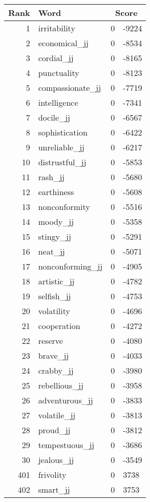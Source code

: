 \begin{longtable}[!htbp]{| rlr@{.}l |}
    \hline
    \textbf{Rank} & \textbf{Word} & \multicolumn{2}{c|}{\textbf{Score}} \\
    \hline
    \endhead
    1 & irritability & 0 & -9224 \\
    2 & economical\_jj & 0 & -8534 \\
    3 & cordial\_jj & 0 & -8165 \\
    4 & punctuality & 0 & -8123 \\
    5 & compassionate\_jj & 0 & -7719 \\
    6 & intelligence & 0 & -7341 \\
    7 & docile\_jj & 0 & -6567 \\
    8 & sophistication & 0 & -6422 \\
    9 & unreliable\_jj & 0 & -6217 \\
    10 & distrustful\_jj & 0 & -5853 \\
    11 & rash\_jj & 0 & -5680 \\
    12 & earthiness & 0 & -5608 \\
    13 & nonconformity & 0 & -5516 \\
    14 & moody\_jj & 0 & -5358 \\
    15 & stingy\_jj & 0 & -5291 \\
    16 & neat\_jj & 0 & -5071 \\
    17 & nonconforming\_jj & 0 & -4905 \\
    18 & artistic\_jj & 0 & -4782 \\
    19 & selfish\_jj & 0 & -4753 \\
    20 & volatility & 0 & -4696 \\
    21 & cooperation & 0 & -4272 \\
    22 & reserve & 0 & -4080 \\
    23 & brave\_jj & 0 & -4033 \\
    24 & crabby\_jj & 0 & -3980 \\
    25 & rebellious\_jj & 0 & -3958 \\
    26 & adventurous\_jj & 0 & -3833 \\
    27 & volatile\_jj & 0 & -3813 \\
    28 & proud\_jj & 0 & -3812 \\
    29 & tempestuous\_jj & 0 & -3686 \\
    30 & jealous\_jj & 0 & -3549 \\
    401 & frivolity & 0 & 3738 \\
    402 & smart\_jj & 0 & 3753 \\

\end{longtable}
